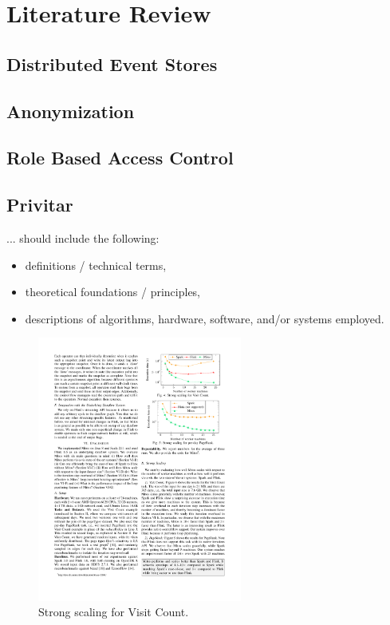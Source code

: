 \chapter{Literature Review\label{cha:chapter2}}

\section{Distributed Event Stores}

\section{Anonymization\label{sec:anon}}

\section{Role Based Access Control}

\section{Privitar}

... should include the following:
\begin{itemize}
    \item definitions / technical terms,
    \item theoretical foundations / principles,
    \item descriptions of algorithms, hardware, software, and/or systems employed.
\end{itemize}



\begin{figure}[h]
\centering
\includegraphics[width=0.6\textwidth]{./img/strong_scaling.pdf}
\caption{Strong scaling for Visit Count\cite{GevayRBMQM21}.}
\end{figure}

